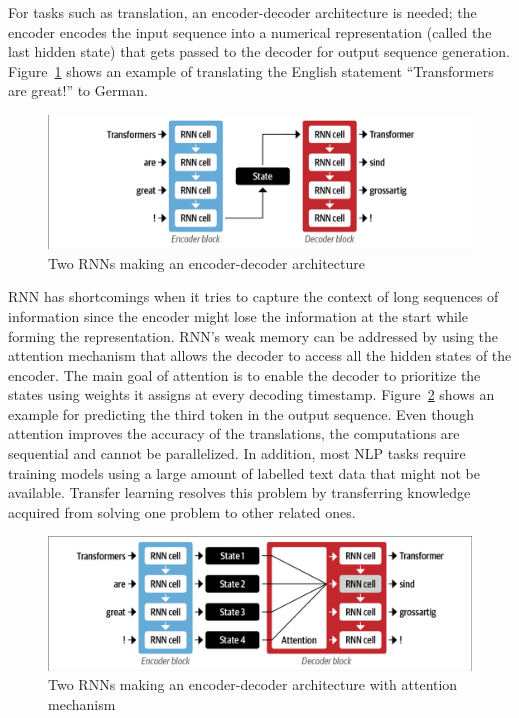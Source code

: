 For tasks such as translation, an encoder-decoder architecture is needed;  the encoder encodes the
input sequence into a numerical representation (called the last hidden state) that gets passed to
the decoder for output sequence generation. Figure~\ref{fig:rnn_encoder_decoder} shows an example of
translating the English statement ``Transformers are great!'' to German. 

\begin{figure}[H]
\begin{center}
  \includegraphics[width=12cm, trim={0.1cm 0.1cm 0.1cm 0.1cm},clip]{./images/encoder-decoder_rnn.png}
\end{center}
\caption{Two \ac{RNN}s making an encoder-decoder architecture \cite{tunstallNaturalLanguageProcessing2022}}
\label{fig:rnn_encoder_decoder}
\end{figure}

\ac{RNN} has shortcomings when it tries to capture the context of long sequences of information
since the encoder might lose the information at the start while forming the representation.
\ac{RNN}'s weak memory can be addressed by using the attention mechanism that allows the decoder to
access all the hidden states of the encoder. The main goal of attention is to enable the decoder to
prioritize the states using weights it assigns at every decoding timestamp.
Figure~\ref{fig:rnn_encoder_decoder_attention} shows an example for predicting the third token in
the output sequence. Even though attention improves the accuracy of the translations, the
computations are sequential and cannot be parallelized. In addition, most \ac{NLP} tasks require
training models using a large amount of labelled text data that might not be available. Transfer
learning resolves this problem by transferring knowledge acquired from solving one problem to other
related ones.

\begin{figure}[H]
\begin{center}
  \includegraphics[width=12cm,trim={0.1cm 0.1cm 0.1cm 0.1cm},clip]{./images/encoder-decoder_rnn_attention.png}
\end{center}
\caption{Two \ac{RNN}s making an encoder-decoder architecture with attention mechanism \cite{tunstallNaturalLanguageProcessing2022}}
\label{fig:rnn_encoder_decoder_attention}
\end{figure}

